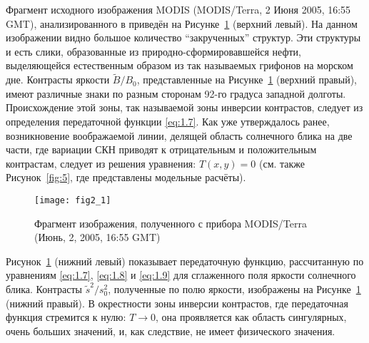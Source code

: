 Фрагмент исходного изображения MODIS (MODIS/Terra, 2 Июня 2005, 16:55 GMT), анализированного в \citep{Hu2009} приведён на Рисунке~\ref{fig:2.1} (верхний левый). На данном изображении видно большое количество ``закрученных'' структур. Эти структуры и есть слики, образованные из природно-сформировавшейся нефти, выделяющейся естественным образом из так называемых грифонов на морском дне. Контрасты яркости $\tilde{B}/B_{0} $, представленные на Рисунке~\ref{fig:2.1} (верхний правый), имеют различные знаки по разным сторонам 92-го градуса западной долготы. Происхождение этой зоны, так называемой зоны инверсии контрастов, следует из определения передаточной функции \eqref{eq:1.7}. Как уже утверждалось ранее, возникновение воображаемой линии, делящей область солнечного блика на две части, где вариации СКН приводят к отрицательным и положительным контрастам, следует из решения уравнения: $T(x,y)=0$ (см. также Рисунок~\ref{fig:5}, где представлены модельные расчёты).



\begin{figure}[!thb]
 \texttt{[image: fig2\_1]}
 \caption{Фрагмент изображения, полученного с прибора MODIS/Terra (Июнь, 2, 2005, 16:55 GMT)}
 \label{fig:2.1}
\end{figure}


Рисунок~\ref{fig:2.1} (нижний левый) показывает передаточную функцию, рассчитанную по уравнениям \eqref{eq:1.7}, \eqref{eq:1.8} и \eqref{eq:1.9} для сглаженного поля яркости солнечного блика. Контрасты $\tilde{s}^{2} /s_{0}^{2} $, полученные по полю яркости, изображены на Рисунке~\ref{fig:2.1} (нижний правый). В окрестности зоны инверсии контрастов, где передаточная функция стремится к нулю: $T\to 0$, она проявляется как область сингулярных, очень больших значений, и, как следствие, не имеет физического значения.

